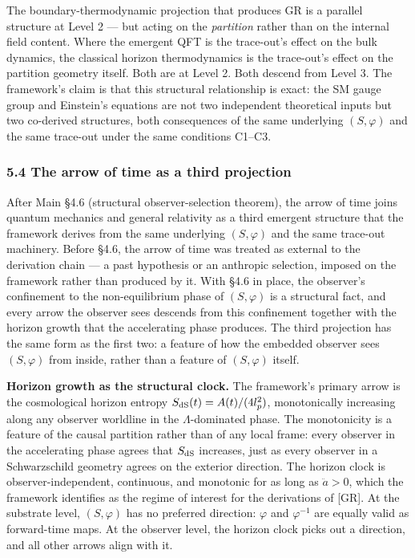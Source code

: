 \documentclass[
]{article}
\begin{document}
The boundary-thermodynamic projection that produces GR is a parallel
structure at Level 2 --- but acting on the \emph{partition} rather than
on the internal field content. Where the emergent QFT is the trace-out's
effect on the bulk dynamics, the classical horizon thermodynamics is the
trace-out's effect on the partition geometry itself. Both are at Level
2. Both descend from Level 3. The framework's claim is that this
structural relationship is exact: the SM gauge group and Einstein's
equations are not two independent theoretical inputs but two co-derived
structures, both consequences of the same underlying \((S, \varphi)\)
and the same trace-out under the same conditions C1--C3.

\hypertarget{the-arrow-of-time-as-a-third-projection}{%
\subsubsection{5.4 The arrow of time as a third
projection}\label{the-arrow-of-time-as-a-third-projection}}

After Main §4.6 (structural observer-selection theorem), the arrow of
time joins quantum mechanics and general relativity as a third emergent
structure that the framework derives from the same underlying
\((S, \varphi)\) and the same trace-out machinery. Before §4.6, the
arrow of time was treated as external to the derivation chain --- a past
hypothesis or an anthropic selection, imposed on the framework rather
than produced by it. With §4.6 in place, the observer's confinement to
the non-equilibrium phase of \((S, \varphi)\) is a structural fact, and
every arrow the observer sees descends from this confinement together
with the horizon growth that the accelerating phase produces. The third
projection has the same form as the first two: a feature of how the
embedded observer sees \((S, \varphi)\) from inside, rather than a
feature of \((S, \varphi)\) itself.

\textbf{Horizon growth as the structural clock.} The framework's primary
arrow is the cosmological horizon entropy
\(S_{\rm dS}(t) = A(t)/(4 l_p^2)\), monotonically increasing along any
observer worldline in the \(\Lambda\)-dominated phase. The monotonicity
is a feature of the causal partition rather than of any local frame:
every observer in the accelerating phase agrees that \(S_{\rm dS}\)
increases, just as every observer in a Schwarzschild geometry agrees on
the exterior direction. The horizon clock is observer-independent,
continuous, and monotonic for as long as \(\ddot a > 0\), which the
framework identifies as the regime of interest for the derivations of
{[}GR{]}. At the substrate level, \((S, \varphi)\) has no preferred
direction: \(\varphi\) and \(\varphi^{-1}\) are equally valid as
forward-time maps. At the observer level, the horizon clock picks out a
direction, and all other arrows align with it.
\end{document}
